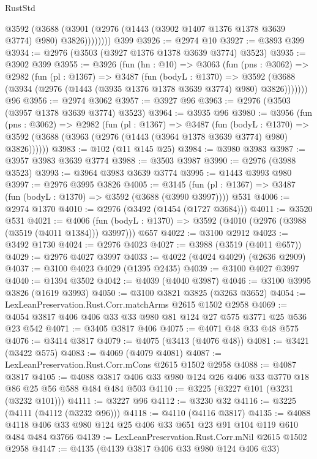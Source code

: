 \begin{lexlean}{RustStd}
\begin{coremodule}
            @3592
              (@3688 (@3901 (@2976 (@1443 (@3902 @1407 @1376 @1378 @3639 @3774) @980) @3826))))))))
    @399
@3926 := @2974 @10
@3927 := @3893 @399
@3934 := @2976 (@3503 (@3927 @1376 @1378 @3639 @3774) @3523)
@3935 := @3902 @399
@3955 := @3926
    (fun (hn : @10) =>
    @3063
      (fun (pns : @3062) =>
      @2982
        (fun (pl : @1367) =>
        @3487
          (fun (bodyL : @1370) =>
          @3592 (@3688 (@3934 (@2976 (@1443 (@3935 @1376 @1378 @3639 @3774) @980) @3826)))))))
    @96
@3956 := @2974 @3062
@3957 := @3927 @96
@3963 := @2976 (@3503 (@3957 @1378 @3639 @3774) @3523)
@3964 := @3935 @96
@3980 := @3956
    (fun (pns : @3062) =>
    @2982
      (fun (pl : @1367) =>
      @3487
        (fun (bodyL : @1370) =>
        @3592 (@3688 (@3963 (@2976 (@1443 (@3964 @1378 @3639 @3774) @980) @3826))))))
@3983 := @102 (@11 @145 @25)
@3984 := @3980 @3983
@3987 := @3957 @3983 @3639 @3774
@3988 := @3503 @3987
@3990 := @2976 (@3988 @3523)
@3993 := @3964 @3983 @3639 @3774
@3995 := @1443 @3993 @980
@3997 := @2976 @3995 @3826
@4005 := @3145 (fun (pl : @1367) => @3487 (fun (bodyL : @1370) => @3592 (@3688 (@3990 @3997)))) @531
@4006 := @2974 @1370
@4010 := @2976 (@3492 (@1454 (@1727 @3684)))
@4011 := @3520 @531
@4021 := @4006
    (fun (bodyL : @1370) => @3592 (@4010 (@2976 (@3988 (@3519 (@4011 @1384))) @3997)))
    @657
@4022 := @3100 @2912
@4023 := @3492 @1730
@4024 := @2976 @4023
@4027 := @3988 (@3519 (@4011 @657))
@4029 := @2976 @4027 @3997
@4033 := @4022 (@4024 @4029) (@2636 @2909)
@4037 := @3100 @4023 @4029 (@1395 @2435)
@4039 := @3100 @4027 @3997
@4040 := @1394 @3502
@4042 := @4039 (@4040 @3987)
@4046 := @3100 @3995 @3826 (@1619 @3993)
@4050 := @3100 @3821 @3825 (@3263 @3652)
@4054 := LexLeanPreservation.Rust.Corr.matchArms @2615 @1502 @2958
@4069 := @4054 @3817 @406 @406 @33 @33 @980 @81 @124 @27 @575 @3771 @25 @536 @23 @542
@4071 := @3405 @3817 @406
@4075 := @4071 @48 @33 @48 @575
@4076 := @3414 @3817
@4079 := @4075 (@3413 (@4076 @48))
@4081 := @3421 (@3422 @575)
@4083 := @4069 (@4079 @4081)
@4087 := LexLeanPreservation.Rust.Corr.mCons @2615 @1502 @2958
@4088 := @4087 @3817
@4105 := @4088 @3817 @406 @33 @980 @124 @26 @406 @33 @3770 @18 @86 @25 @56 @588 @484 @484 @503
@4110 := @3225 (@3227 @101 (@3231 (@3232 @101)))
@4111 := @3227 @96
@4112 := @3230 @32
@4116 := @3225 (@4111 (@4112 (@3232 @96)))
@4118 := @4110 (@4116 @3817)
@4135 := @4088 @4118 @406 @33 @980 @124 @25 @406 @33 @651 @23 @91 @104 @119 @610 @484 @484 @3766
@4139 := LexLeanPreservation.Rust.Corr.mNil @2615 @1502 @2958
@4147 := @4135 (@4139 @3817 @406 @33 @980 @124 @406 @33)

\end{coremodule}
\end{lexlean}
